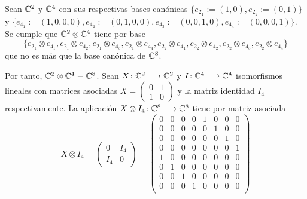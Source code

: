 \begin{example} Sean $\mathbb{C}^2$ y $\mathbb{C}^4$ con sus respectivas bases canónicas $\{e_{2_1}:=(1,0),e_{2_2}:=(0,1)\}$ y $\{e_{4_1}:=(1,0,0,0),e_{4_2}:=(0,1,0,0), e_{4_3}:=(0,0,1,0),e_{4_4}:=(0,0,0,1)\}$. Se cumple que $\mathbb{C}^2\otimes\mathbb{C}^4$ tiene por base $$\{e_{2_1}\otimes e_{4_1},e_{2_1}\otimes e_{4_2},e_{2_1}\otimes e_{4_3},e_{2_1}\otimes e_{4_4},e_{2_2}\otimes e_{4_1},e_{2_2}\otimes e_{4_2},e_{2_2}\otimes e_{4_3},e_{2_2}\otimes e_{4_4}\}$$ 
que no es más que la base canónica de $\mathbb{C}^8$.

Por tanto, $\mathbb{C}^2\otimes\mathbb{C}^4\equiv\mathbb{C}^8$. Sean $X\colon \mathbb{C}^2\longrightarrow \mathbb{C}^2$ y $I\colon \mathbb{C}^4\longrightarrow \mathbb{C}^4$ isomorfismos lineales con matrices asociadas $X=\left(\begin{matrix}
0&1\\1&0\end{matrix}\right)$ y la matriz identidad $I_4$ respectivamente. La aplicación $X\otimes I_4\colon \mathbb{C}^8\longrightarrow \mathbb{C}^8$ tiene por matriz asociada
\[
X\otimes I_4=
\left(\begin{matrix}
0&I_4\\
I_4&0
\end{matrix}\right)
=
\left(\begin{matrix}
0&0&0&0&1&0&0&0\\
0&0&0&0&0&1&0&0\\
0&0&0&0&0&0&1&0\\
0&0&0&0&0&0&0&1\\
1&0&0&0&0&0&0&0\\
0&1&0&0&0&0&0&0\\
0&0&1&0&0&0&0&0\\
0&0&0&1&0&0&0&0\\
\end{matrix}\right)\]


\end{example}
